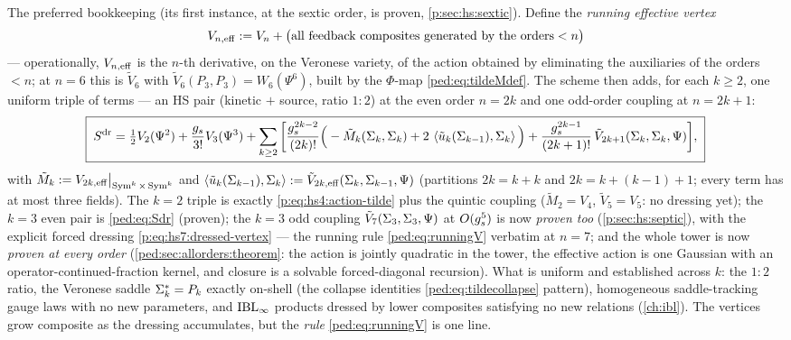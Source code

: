 The preferred bookkeeping (its first instance, at the sextic order, is proven,
\cref{p:sec:hs:sextic}). Define the \emph{running effective vertex}
\begin{equation}
	V_{n,\rm eff}
	:= V_n+\big(\text{all feedback composites generated by the orders}<n\big)
	\label{ped:eq:runningV}
\end{equation}
--- operationally, $V_{n,\rm eff}$ is the $n$-th derivative, on the Veronese variety, of
the action obtained by eliminating the auxiliaries of the orders $<n$; at $n=6$ this is
$\tilde V_6$ with $\tilde V_6(P_3,P_3)=W_6(\Psi^6)$, built by the $\Phi$-map
\eqref{ped:eq:tildeMdef}. The scheme then adds, for each $k\ge2$, one uniform triple of
terms --- an HS pair (kinetic $+$ source, ratio $1{:}2$) at the even order $n=2k$ and
one odd-order coupling at $n=2k+1$:
\begin{equation}
	\boxed{\;
	S^{\rm dr}
	= \tfrac12V_2(\Psi^2)+\frac{g_s}{3!}V_3(\Psi^3)
	+\sum_{k\ge2}\bigg[
	\frac{g_s^{2k-2}}{(2k)!}\Big(-\tilde M_k(\Sigma_k,\Sigma_k)
	+2\,\left \langle \tilde u_k(\Sigma_{k-1}),\Sigma_k \right \rangle\Big)
	+\frac{g_s^{2k-1}}{(2k+1)!}\,\tilde V_{2k+1}(\Sigma_k,\Sigma_k,\Psi)
	\bigg],
	\;}
	\label{ped:eq:Sdrallorders}
\end{equation}
with $\tilde M_k:=V_{2k,\rm eff}\big|_{\operatorname{Sym}^k\times\operatorname{Sym}^k}$ and
$\left \langle \tilde u_k(\Sigma_{k-1}),\Sigma_k \right \rangle:=\tilde V_{2k,\rm eff}(\Sigma_k,\Sigma_{k-1},\Psi)$
(partitions $2k=k+k$ and $2k=k+(k{-}1)+1$; every term has at most three fields). The
$k=2$ triple is exactly \eqref{p:eq:hs4:action-tilde} plus the quintic coupling ($\tilde M_2=V_4$,
$\tilde V_5=V_5$: no dressing yet); the $k=3$ even pair is \eqref{ped:eq:Sdr}
(proven); the $k=3$ odd coupling $\tilde V_7(\Sigma_3,\Sigma_3,\Psi)$ at
$O(g_s^5)$ is now \emph{proven too} (\cref{p:sec:hs:septic}), with the
explicit forced dressing \eqref{p:eq:hs7:dressed-vertex} --- the running rule \eqref{ped:eq:runningV}
verbatim at $n=7$; and the whole tower is now \emph{proven at every order}
(\cref{ped:sec:allorders:theorem}: the action is jointly quadratic in the
tower, the effective action is one Gaussian with an operator-continued-fraction
kernel, and closure is a solvable forced-diagonal recursion). What is uniform and established across $k$: the $1{:}2$ ratio, the
Veronese saddle $\Sigma_k^*=P_k$ exactly on-shell (the collapse identities
\eqref{ped:eq:tildecollapse} pattern), homogeneous saddle-tracking gauge laws with no new
parameters, and $\mathrm{IBL}_\infty$ products dressed by lower
composites satisfying no new relations (\cref{ch:ibl}). The vertices grow composite as the dressing accumulates,
but the \emph{rule} \eqref{ped:eq:runningV} is one line.

